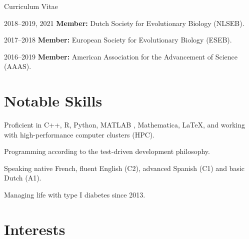 \documentclass[11pt,a4paper]{article}
\begin{document}
\begin{cv}{Curriculum Vitae}
\begin{cvlist}{}
			\item[2018--2019, 2021] \textbf{Member:} Dutch Society for Evolutionary Biology (NLSEB).
			
			\item[2017--2018] \textbf{Member:} European Society for Evolutionary Biology (ESEB).
			
			\item[2016--2019] \textbf{Member:} American Association for the Advancement of Science (AAAS).
			
		\end{cvlist}
		
		\section{Notable Skills}
		
		\begin{cvlist}{}
			
			\item Proficient in C++, R, Python, MATLAB , Mathematica, LaTeX, and working with high-performance computer clusters (HPC).
			\item Programming according to the test-driven development philosophy.
			\item Speaking native French, fluent English (C2), advanced Spanish (C1) and basic Dutch (A1).
			\item Managing life with type I diabetes since 2013.
			
		\end{cvlist}
	
		\section{Interests}
		
		
		
		\vfill
		\date{}
		
	\end{cv}
	
\end{document}
